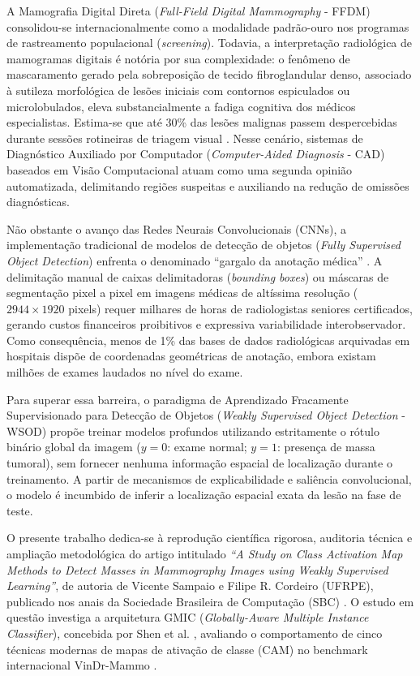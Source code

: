 \documentclass[12pt]{article}
\begin{document}
A Mamografia Digital Direta (\textit{Full-Field Digital Mammography} - FFDM) consolidou-se internacionalmente como a modalidade padrão-ouro nos programas de rastreamento populacional (\textit{screening}). Todavia, a interpretação radiológica de mamogramas digitais é notória por sua complexidade: o fenômeno de mascaramento gerado pela sobreposição de tecido fibroglandular denso, associado à sutileza morfológica de lesões iniciais com contornos espiculados ou microlobulados, eleva substancialmente a fadiga cognitiva dos médicos especialistas. Estima-se que até 30\% das lesões malignas passem despercebidas durante sessões rotineiras de triagem visual \cite{ribli2018detecting}. Nesse cenário, sistemas de Diagnóstico Auxiliado por Computador (\textit{Computer-Aided Diagnosis} - CAD) baseados em Visão Computacional atuam como uma segunda opinião automatizada, delimitando regiões suspeitas e auxiliando na redução de omissões diagnósticas.

Não obstante o avanço das Redes Neurais Convolucionais (CNNs), a implementação tradicional de modelos de detecção de objetos (\textit{Fully Supervised Object Detection}) enfrenta o denominado ``gargalo da anotação médica'' \cite{shen2021interpretable}. A delimitação manual de caixas delimitadoras (\textit{bounding boxes}) ou máscaras de segmentação pixel a pixel em imagens médicas de altíssima resolução ($2944 \times 1920$ pixels) requer milhares de horas de radiologistas seniores certificados, gerando custos financeiros proibitivos e expressiva variabilidade interobservador. Como consequência, menos de 1\% das bases de dados radiológicas arquivadas em hospitais dispõe de coordenadas geométricas de anotação, embora existam milhões de exames laudados no nível do exame.

Para superar essa barreira, o paradigma de Aprendizado Fracamente Supervisionado para Detecção de Objetos (\textit{Weakly Supervised Object Detection} - WSOD) propõe treinar modelos profundos utilizando estritamente o rótulo binário global da imagem ($y=0$: exame normal; $y=1$: presença de massa tumoral), sem fornecer nenhuma informação espacial de localização durante o treinamento. A partir de mecanismos de explicabilidade e saliência convolucional, o modelo é incumbido de inferir a localização espacial exata da lesão na fase de teste.

O presente trabalho dedica-se à reprodução científica rigorosa, auditoria técnica e ampliação metodológica do artigo intitulado \textit{``A Study on Class Activation Map Methods to Detect Masses in Mammography Images using Weakly Supervised Learning''}, de autoria de Vicente Sampaio e Filipe R. Cordeiro (UFRPE), publicado nos anais da Sociedade Brasileira de Computação (SBC) \cite{sampaio2022study}. O estudo em questão investiga a arquitetura GMIC (\textit{Globally-Aware Multiple Instance Classifier}), concebida por Shen et al. \cite{shen2021interpretable}, avaliando o comportamento de cinco técnicas modernas de mapas de ativação de classe (CAM) no benchmark internacional VinDr-Mammo \cite{vindrmammo2022}.
\end{document}
